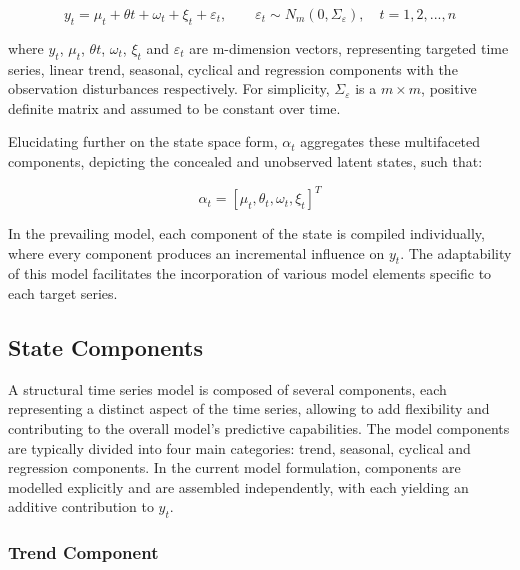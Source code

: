     \begin{equation}
        y_{t} = \mu_{t} + \theta{t} + \omega_{t} + \xi_{t} + \varepsilon_{t} ,
        \qquad \varepsilon_{t} \sim N_{m}(0, \Sigma_{\varepsilon}), \quad t = 1, 2, ..., n
    \label{eq:sts}
    \end{equation}

    where $y_{t}$, $\mu_{t}$, $\theta{t}$, $\omega_{t}$, $\xi_{t}$ and $\varepsilon_{t}$ are m-dimension vectors,
    representing targeted time series, linear trend, seasonal, cyclical and regression components
    with the observation disturbances respectively.
    For simplicity, $\Sigma_{\varepsilon}$ is a $m \times m$, positive definite matrix and assumed to be constant over time.

    Elucidating further on the state space form, $\alpha_{t}$ aggregates these multifaceted components,
    depicting the concealed and unobserved latent states, such that:

   \begin{equation}
        \alpha_{t} = [\mu_{t}, \theta_{t}, \omega_{t}, \xi_{t}]^T
    \label{eq:sts_latent}
    \end{equation}


    In the prevailing model, each component of the state is compiled individually,
    where every component produces an incremental influence on $y_{t}$.
    The adaptability of this model facilitates the incorporation of various model elements specific to each target series.

\subsection{State Components}
    \label{sec:state_components}

    A structural time series model is composed of several components, each representing a distinct aspect of the time series,
    allowing to add flexibility and contributing to the overall model's predictive capabilities.
    The model components are typically divided into four main categories: trend, seasonal, cyclical and regression components.
    In the current model formulation, components are modelled explicitly and are assembled independently,
    with each yielding an additive contribution to $y_{t}$.

\subsubsection{Trend Component}
    \label{sec:trend_component}

